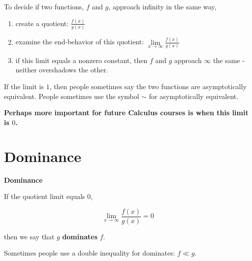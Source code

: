\documentclass{ximera}
\begin{document}
\begin{idea}


To decide if two functions, $f$ and $g$, approach infinity in the same way, 

\begin{enumerate}
\item create a quotient: $\frac{f(x)}{g(x)}$ 


\item examine the end-behavior of this quotient: $\lim\limits_{x \to \infty} \frac{f(x)}{g(x)}$ 


\item if this limit equals a nonzero constant, then $f$ and $g$ approach $\infty$ the same - neither overshadows the other.
\end{enumerate}


If the limit is $1$, then people sometimes say the two functions are asymptotically equivalent. People sometimes use the symbol $\sim$ for asymptotically equivalent. 

\end{idea}




\begin{center}

\textbf{\textcolor{purple!85!blue}{Perhaps more important for future Calculus courses is when this limit is $0$.}} 

\end{center}















\section*{Dominance}



\begin{definition}  \textbf{\textcolor{green!50!black}{Dominance}} 

If the quotient limit equals $0$,

\[  \lim_{x \to \infty} \frac{f(x)}{g(x)}  = 0\]

then we say that $g$ \textbf{dominates} $f$. 



Sometimes people use a double inequality for dominates:  $f \ll g$.

\end{definition}
\end{document}
